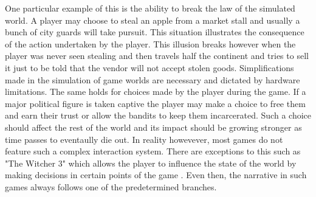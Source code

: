 One particular example of this is the ability to break the law of the simulated world.
A player may choose to steal an apple from a market stall and usually a bunch of city guards will take pursuit.
This situation illustrates the consequence of the action undertaken by the player.
This illusion breaks however when the player was never seen stealing and then travels half the continent and tries to sell it just to be told that the vendor will not accept stolen goods.
Simplifications made in the simulation of game worlds are necessary and dictated by hardware limitations.
The same holds for choices made by the player during the game.
If a major political figure is taken captive the player may make a choice to free them and earn their trust or allow the bandits to keep them incarcerated.
Such a choice should affect the rest of the world and its impact should be growing stronger as time passes to eventaully die out.
In reality howevever, most games do not feature such a complex interaction system.
There are exceptions to this such as "The Witcher 3" which allows the player to influence the state of the world by making decisions in certain points of the game \cite{vickery2018directing}.
Even then, the narrative in such games always follows one of the predetermined branches.

